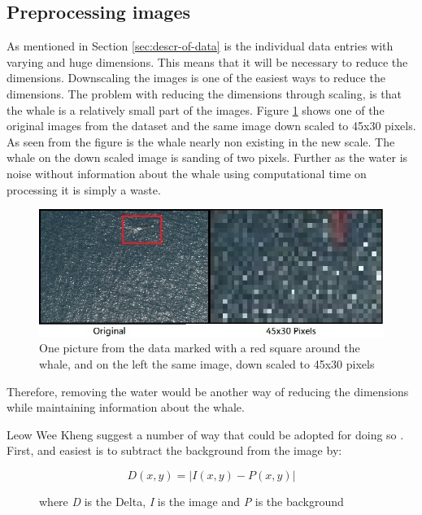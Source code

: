 \subsection{Preprocessing images}
\label{sec:litterature}
As mentioned in Section \ref{sec:descr-of-data} is the individual data entries with varying and huge dimensions. 
This means that it will be necessary to reduce the dimensions. 
Downscaling the images is one of the easiest ways to reduce the dimensions.
The problem with reducing the dimensions through scaling, is that the whale is a relatively small part of the images. Figure \ref{fig:scale} shows one of the original images from the dataset and the same image down scaled to 45x30 pixels. As seen from the figure is the whale nearly non existing in the new scale. The whale on the down scaled image is sanding of two pixels.  
Further as the water is noise without information about the whale using computational time on processing it is simply a waste.

\begin{figure}
	\centering
	\includegraphics[width=\linewidth]{Images/scale}
	\caption{One picture from the data marked with a red square around the whale, and on the left the same image, down scaled to 45x30 pixels}
\label{fig:scale}
\end{figure}

Therefore, removing the water would be another way of reducing the dimensions while maintaining information about the whale.

Leow Wee Kheng suggest a number of way that could be adopted for doing so \cite{backgroundRemoval}.
First, and easiest is to subtract the background from the image by:
\begin{figure}[H]
\begin{equation}
D(x,y) = |I(x,y) - P(x,y)|
\end{equation}
\caption{where \emph{D} is the Delta, \emph{I} is the image and \emph{P} is the background}
\end{figure}

